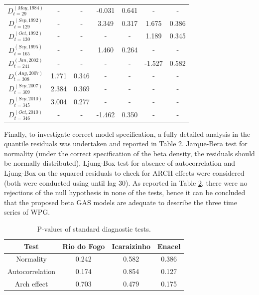 \documentclass[a4paper]{IEEEtran}
\begin{document}
\begin{table}[htbp]
\begin{tabular}{ccccccc}
$D_{t=29}^{(May, 1984)}$   & -          & -         & -0.031      & 0.641     & -          & -     \\
$D_{t=129}^{(Sep, 1992)}$  & -          & -         & 3.349      & 0.317     & 1.675      & 0.386     \\
$D_{t=130}^{(Oct, 1992)}$  & -          & -         & -          & -         & 1.189      & 0.345     \\
$D_{t=165}^{(Sep, 1995)}$  & -          & -         & 1.460      & 0.264     & -          & -     \\
$D_{t=241}^{(Jan, 2002)}$  & -          & -         & -          & -         &-1.527      & 0.582     \\
$D_{t=308}^{(Aug, 2007)}$  & 1.771      & 0.346     & -          & -         & -          & -         \\
$D_{t=309}^{(Sep, 2007)}$  & 2.384      & 0.369     & -          & -         & -          & -         \\
$D_{t=345}^{(Sep, 2010)}$  & 3.004      & 0.277     & -          & -         & -          & -         \\
$D_{t=346}^{(Oct, 2010)}$  & -          & -         & -1.462     & 0.350     & -          & - \\\hline
\end{tabular}
\label{table1}
\end{table}

Finally, to investigate correct model specification, a fully detailed analysis in the quantile residuals was undertaken and reported in Table \ref{table2}. Jarque-Bera test for normality (under the correct specification of the beta density, the residuals should be normally distributed), Ljung-Box test for absence of autocorrelation and Ljung-Box on the squared residuals to check for ARCH effects were considered (both were conducted using until lag 30). As reported in Table \ref{table2}, there were no rejections of the null hypothesis in none of the tests, hence it can be concluded that the proposed beta GAS models are adequate to describe the three time series of WPG.

\begin{table}[htbp]
\centering
\caption{P-values of standard diagnostic tests.}
\begin{tabular}{c|ccc}
\hline
{\bf Test}      & {\bf Rio do Fogo} & {\bf Icaraizinho} & {\bf Enacel} \\ \hline
Normality       & 0.242             & 0.582            & 0.386         \\
Autocorrelation & 0.174             & 0.854            & 0.127         \\
Arch effect     & 0.703             & 0.479            & 0.175         \\ \hline
\end{tabular}
\label{table2}
\end{table}
\end{document}
